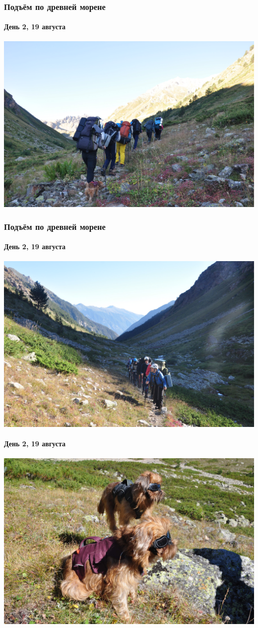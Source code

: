 \begin{frame}
	\frametitle{Подъём по древней морене}
	\framesubtitle{День 2, 19 августа}
	\centering
	\includegraphics[width=\linewidth]{../pics/DSC_0621}
\end{frame}	


\begin{frame}
	\frametitle{Подъём по древней морене}
	\framesubtitle{День 2, 19 августа}
	\centering
	\includegraphics[width=\linewidth]{../pics/DSC_0666}
	\end{frame}

\begin{frame}
	\framesubtitle{День 2, 19 августа}
	\centering
	\includegraphics[width=\linewidth]{../pics/DSC_0683}
	\end{frame}


